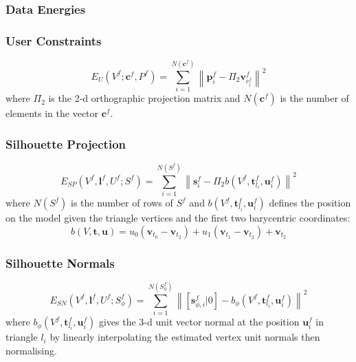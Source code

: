 \documentclass[a4paper,10pt]{article}
\newcommand{\mb}{\mathbf}
\begin{document}
\subsubsection{Data Energies}
\subsubsection*{User Constraints}

\begin{equation}
\label{eq:user_constraints}
E_{U}(V^f ; \mb{c}^f, P^f) = \sum_{i=1}^{N(\mb{c}^f)} \left\| \mb{p}^f_i - \Pi_2 \mb{v}^f_{c^f_i} \right\|^2
\end{equation}
where $\Pi_2$ is the 2-d orthographic projection matrix and $N(\mb{c}^f)$ is the number of elements in the vector $\mb{c}^f$.

\subsubsection*{Silhouette Projection}

\begin{equation}
\label{eq:silhouette_projection}
E_{SP}(V^f, \mb{l}^f, U^f ; S^f) = \sum_{i=1}^{N(S^f)} \left\| \mb{s}^f_i - \Pi_2 b(V^f, \mb{t}^f_{l_i}, \mb{u}^f_i) \right\|^2
\end{equation}
where $N(S^f)$ is the number of rows of $S^f$ and $b(V^f, \mb{t}^f_{l_i}, \mb{u}^f_i)$ defines the position on the model given the triangle vertices and the first two barycentric coordinates:
\begin{equation}
b(V, \mb{t}, \mb{u}) = 
u_0 \left( \mb{v}_{t_0} - \mb{v}_{t_2} \right) +  
u_1 \left( \mb{v}_{t_1} - \mb{v}_{t_2} \right) +  
\mb{v}_{t_2}
\end{equation}

\subsubsection*{Silhouette Normals}

\begin{equation}
\label{eq:silhouette_normal}
E_{SN}(V^f, \mb{l}^f, U^f ; S_\phi^f) = \sum_{i=1}^{N(S_\phi^f)} \left\| [ \mb{s}^f_{\phi, i} | 0 ] - b_{\phi}(V^f, \mb{t}^f_{l_i}, \mb{u}^f_i) \right\|^2
\end{equation}
where $b_{\phi}(V^f, \mb{t}^f_{l_i}, \mb{u}^f_i)$ gives the 3-d unit vector normal at the position $\mb{u}^f_i$ in triangle $l_i$ by linearly interpolating the estimated vertex unit normals then normalising.
\end{document}
